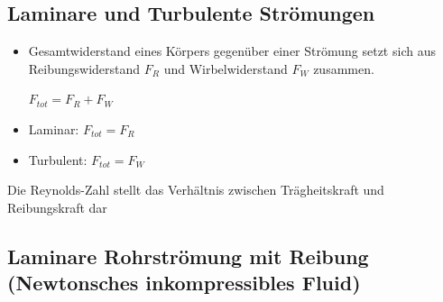 \documentclass[a4paper,10pt,twoside]{article}
\begin{document}
\subsection{Laminare und Turbulente Strömungen}
\begin{itemize}
\item Gesamtwiderstand eines Körpers gegenüber einer Strömung setzt sich aus Reibungswiderstand $F_R$ und Wirbelwiderstand $F_W$ zusammen. \par 
\begin{center}
$F_{tot} = F_R + F_W$ 
\end{center}
\item Laminar: $F_{tot} = F_R$
\item Turbulent: $F_{tot} = F_W$

\end{itemize}
\pp

Die Reynolds-Zahl stellt das Verhältnis zwischen Trägheitskraft und Reibungskraft dar

\pagebreak
\reversemarginpar
\subsection{Laminare Rohrströmung mit Reibung (Newtonsches inkompressibles Fluid)}
\end{document}
